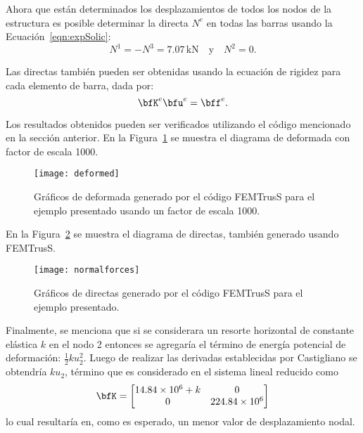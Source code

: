 Ahora que están determinados los desplazamientos de todos los nodos de la estructura es posible determinar la directa $N^e$ en todas las barras usando la Ecuación~\eqref{eqn:expSolic}:
%
\begin{equation}
N^1 = - N^3 =7.07 \, \text{kN} \quad \text{y} \quad N^2 = 0.
\end{equation}


Las directas también pueden ser obtenidas usando la ecuación de rigidez para cada elemento de barra, dada por:
%
$$
\bfK^e \bfu^e = \bff^e.
$$


Los resultados obtenidos pueden ser verificados utilizando el código mencionado en la sección anterior. En la Figura~\ref{fig:ejbarraDef} se muestra el diagrama de deformada con factor de escala 1000.

\begin{figure}[htb!]
	\centering
	\texttt{[image: deformed]}
	\caption{Gráficos de deformada generado por el código FEMTrusS para el ejemplo presentado usando un factor de escala 1000.}
	\label{fig:ejbarraDef}
\end{figure}


En la Figura~\ref{fig:ejbarraDir} se muestra el diagrama de directas, también generado usando FEMTrusS.  %

\begin{figure}[htb!]
	\centering
	\texttt{[image: normalforces]}
	\caption{Gráficos de directas generado por el código FEMTrusS para el ejemplo presentado.}
	\label{fig:ejbarraDir}
\end{figure}



Finalmente, se menciona que si se considerara un resorte horizontal de constante elástica $k$ en el nodo 2 entonces se agregaría el término de energía potencial de deformación: $\frac{1}{2} k u_2^2$. %
Luego de realizar las derivadas establecidas por Castigliano se obtendría $k u_2$, término que es considerado en el sistema lineal reducido como
%
\begin{equation}
\bfK =
\left[
\begin{matrix}
14.84 \times10^6 +k & 0 \\
0 & 224.84 \times10^6 
\end{matrix}
\right]
\end{equation}
%
lo cual resultaría en, como es esperado, un menor valor de desplazamiento nodal.




